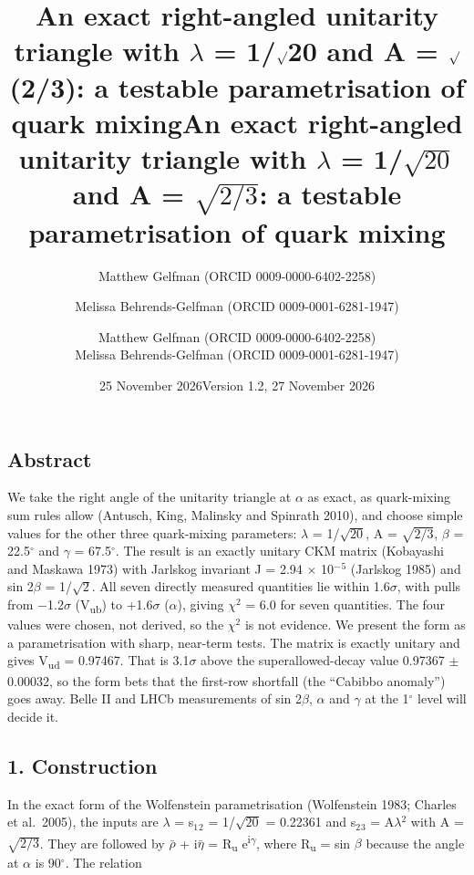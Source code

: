 \documentclass[
  11pt,
]{article}
\title{An exact right-angled unitarity triangle with \ensuremath{\lambda} = 1/\ensuremath{\surd}20 and A =
\ensuremath{\surd}(2/3): a testable parametrisation of quark mixing}
\author{Matthew Gelfman (ORCID 0009-0000-6402-2258) \and Melissa
Behrends-Gelfman (ORCID 0009-0001-6281-1947)}
\date{25 November 2026}
\title{An exact right-angled unitarity triangle with \ensuremath{\lambda} = 1/\ensuremath{\sqrt{20}} and A = \ensuremath{\sqrt{2/3}}:
a testable parametrisation of quark mixing}
\author{Matthew Gelfman (ORCID 0009-0000-6402-2258) \\ Melissa Behrends-Gelfman (ORCID 0009-0001-6281-1947)}
\date{Version 1.2, 27 November 2026}
\begin{document}
\maketitle
\hypertarget{abstract}{%
\subsection{Abstract}\label{abstract}}

We take the right angle of the unitarity triangle at \ensuremath{\alpha} as exact, as quark-mixing sum rules allow (Antusch, King, Malinsky and Spinrath 2010), and choose simple values for the other three quark-mixing parameters: \ensuremath{\lambda} = 1/\ensuremath{\sqrt{20}}, A = \ensuremath{\sqrt{2/3}}, \ensuremath{\beta} = 22.5\ensuremath{^\circ} and \ensuremath{\gamma} = 67.5\ensuremath{^\circ}. The result is an exactly unitary CKM matrix (Kobayashi and Maskawa 1973) with Jarlskog invariant J = 2.94 \ensuremath{\times} 10\ensuremath{^{-}}\ensuremath{^{5}} (Jarlskog 1985) and sin 2\ensuremath{\beta} = 1/\ensuremath{\sqrt{2}}. All seven directly measured quantities lie within 1.6\ensuremath{\sigma}, with pulls from \ensuremath{-}1.2\ensuremath{\sigma} (\textbar V\textsubscript{ub}\textbar) to +1.6\ensuremath{\sigma} (\ensuremath{\alpha}), giving \ensuremath{\chi}\ensuremath{^{2}} = 6.0 for seven quantities. The four values were chosen, not derived, so the \ensuremath{\chi}\ensuremath{^{2}} is not evidence. We present the form as a parametrisation with sharp, near-term tests. The matrix is exactly unitary and gives \textbar V\textsubscript{ud}\textbar{} = 0.97467. That is 3.1\ensuremath{\sigma} above the superallowed-decay value 0.97367 \ensuremath{\pm} 0.00032, so the form bets that the first-row shortfall (the ``Cabibbo anomaly'') goes away. Belle II and LHCb measurements of sin 2\ensuremath{\beta}, \ensuremath{\alpha} and \ensuremath{\gamma} at the 1\ensuremath{^\circ} level will decide it.

\hypertarget{construction}{%
\subsection{1. Construction}\label{construction}}

In the exact form of the Wolfenstein parametrisation (Wolfenstein 1983; Charles et al.~2005), the inputs are \ensuremath{\lambda} = s\ensuremath{_{1}}\ensuremath{_{2}} = 1/\ensuremath{\sqrt{20}} = 0.22361 and s\ensuremath{_{2}}\ensuremath{_{3}} = A\ensuremath{\lambda}\ensuremath{^{2}} with A = \ensuremath{\sqrt{2/3}}. They are followed by \ensuremath{\bar{ρ}} + i\ensuremath{\bar{η}} = R\textsubscript{u} e\textsuperscript{i\ensuremath{\gamma}}, where R\textsubscript{u} = sin \ensuremath{\beta} because the angle at \ensuremath{\alpha} is 90\ensuremath{^\circ}. The relation
\end{document}
